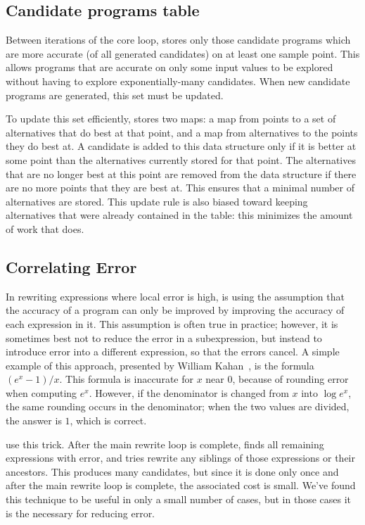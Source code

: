 \documentclass[paper.tex]{subfiles}
\begin{document}
\subsection{Candidate programs table}

Between iterations of the core loop,
  \casio stores only those candidate programs
  which are more accurate (of all generated candidates)
  on at least one sample point.
This allows programs that are accurate
  on only some input values to be explored
  without having to explore exponentially-many candidates.
When new candidate programs are generated,
  this set must be updated.

To update this set efficiently, \casio stores two maps:
  a map from points to a set of alternatives that do best at that point,
  and a map from alternatives to the points they do best at.
A candidate is added to this data structure
  only if it is better at some point
  than the alternatives currently stored for that point.
The alternatives that are no longer best at this point
  are removed from the data structure
  if there are no more points that they are best at.
This ensures that a minimal number of alternatives are stored.
This update rule is also biased toward keeping alternatives
  that were already contained in the table:
  this minimizes the amount of work that \casio does.

\subsection{Correlating Error}

In rewriting expressions where local error is high,
  \casio is using the assumption
  that the accuracy of a program can only be improved
  by improving the accuracy of each expression in it.
This assumption is often true in practice;
  however, it is sometimes best not to reduce the error in a subexpression,
  but instead to introduce error into a different expression,
  so that the errors cancel.
A simple example of this approach,
  presented by William Kahan~\cite{kahan-java-hurts},
  is the formula $(e^x - 1) / x$.
This formula is inaccurate for $x$ near $0$,
  because of rounding error when computing $e^x$.
However, if the denominator is changed from $x$ into $\log e^x$,
  the same rounding occurs in the denominator;
  when the two values are divided, the answer is $1$, which is correct.

\casio use this trick.
After the main rewrite loop is complete,
  \casio finds all remaining expressions with error,
  and tries rewrite any siblings of those expressions or their ancestors.
This produces many candidates, but since it is done only once
  and after the main rewrite loop is complete, the associated cost is small.
We've found this technique to be useful in only a small number of cases,
  but in those cases it is the necessary for reducing error.
\end{document}
